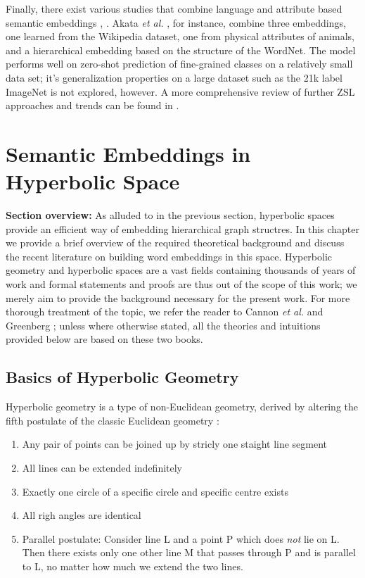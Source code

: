 \documentclass[12pt]{report}
\begin{document}
Finally, there exist various studies that combine language and attribute based semantic embeddings \cite{Akata2015}, \cite{Fu2015} \cite{Zhou2005}. Akata \textit{et al.} \cite{Akata2015}, for instance, combine three embeddings, one learned from the Wikipedia dataset, one from physical attributes of animals, and a hierarchical embedding based on the structure of the WordNet. The model performs well on zero-shot prediction of fine-grained classes on a relatively small data set; it's generalization properties on a large dataset such as the 21k label ImageNet is not explored, however. A more comprehensive review of further ZSL approaches and trends can be found in \cite{Xian2017}.


\section{Semantic Embeddings in Hyperbolic Space}

\textbf{Section overview:} As alluded to in the previous section, hyperbolic spaces provide an efficient way of embedding hierarchical graph structres. In this chapter we provide a brief overview of the required theoretical background and discuss the recent literature on building word embeddings in this space. Hyperbolic geometry and hyperbolic spaces are a vast fields containing thousands of years of work and formal statements and proofs are thus out of the scope of this work; we merely aim to provide the background necessary for the present work. For more thorough treatment of the topic, we refer the reader to Cannon \textit{et al.} \cite{} and Greenberg \cite{Greenberg1994}; unless where otherwise stated, all the theories and intuitions provided below are based on these two books.

\subsection{Basics of Hyperbolic Geometry}
Hyperbolic geometry is a type of non-Euclidean geometry, derived by altering the fifth postulate of the classic Euclidean geometry \cite{Greenberg1994}:
\begin{enumerate}
    \item Any pair of points can be joined up by stricly one staight line segment
    \item All lines can be extended indefinitely
    \item Exactly one circle of a specific circle and specific centre exists
    \item All righ angles are identical
    \item Parallel postulate: Consider line L and a point P which does \textit{not} lie on L. Then there exists only one other line M that passes through P and is parallel to L, no matter how much we extend the two lines.
\end{enumerate}
\end{document}
